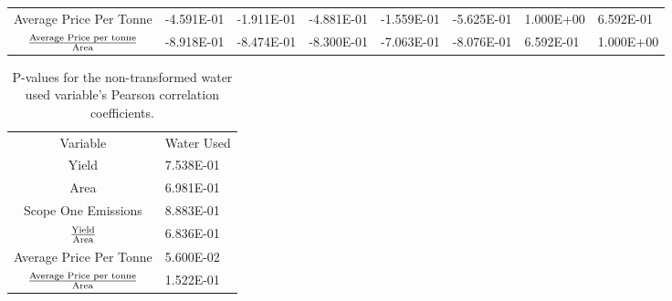 \documentclass[12pt,australian]{article}
\begin{document}
\begin{sloppypar}
\begin{table}[]
\begin{tabular}{clllllll}
    Average Price Per Tonne                            & -4.591E-01                & -1.911E-01               & -4.881E-01                     & -1.559E-01                              & -5.625E-01                                         & 1.000E+00                                   & 6.592E-01                                                              \\
    ${\text{Average Price per tonne}\over\text{Area}}$ & -8.918E-01                & -8.474E-01               & -8.300E-01                     & -7.063E-01                              & -8.076E-01                                         & 6.592E-01                                   & 1.000E+00                                                             
    \end{tabular}
    \end{table}

    \begin{table}[]
      \caption{P-values for the non-transformed water used variable's Pearson correlation coefficients.}
    \label{tab:tab4}
      \begin{tabular}{cl}
      Variable                                           & Water Used \\
      Yield                                              & 7.538E-01  \\
      Area                                               & 6.981E-01  \\
      Scope One Emissions                                & 8.883E-01  \\
      $\text{Yield}\over\text{Area}$                     & 6.836E-01  \\
      Average Price Per Tonne                            & 5.600E-02  \\
      ${\text{Average Price per tonne}\over\text{Area}}$ & 1.522E-01 
      \end{tabular}
      \end{table}


\end{sloppypar}
\end{document}
